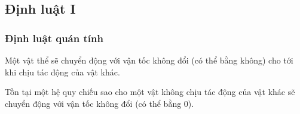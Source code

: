 \subsection{Định luật I}
\begin{frame}
    \frametitle{Định luật quán tính}
    \begin{tcolorbox}[colback=blue!10, colframe=blue!50!black, title= Định luật I]
        Một vật thể sẽ chuyển động với vận tốc không đổi (có thể bằng không) cho tới khi chịu tác động của vật khác.
    \end{tcolorbox}
    \begin{tcolorbox}[colback=blue!10, colframe=blue!50!black, title=Hệ quy chiếu quán tính]
        Tồn tại một hệ quy chiếu sao cho một vật không chịu tác động của vật khác sẽ chuyển động với vận tốc không đổi (có thể bằng 0).
    \end{tcolorbox}
\end{frame}
